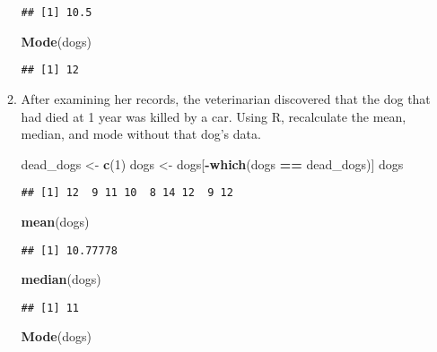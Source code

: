 \documentclass[]{article}
\newenvironment{Shaded}{\begin{snugshade}}{\end{snugshade}}
\newcommand{\KeywordTok}[1]{\textcolor[rgb]{0.13,0.29,0.53}{\textbf{#1}}}
\newcommand{\DecValTok}[1]{\textcolor[rgb]{0.00,0.00,0.81}{#1}}
\newcommand{\StringTok}[1]{\textcolor[rgb]{0.31,0.60,0.02}{#1}}
\newcommand{\OperatorTok}[1]{\textcolor[rgb]{0.81,0.36,0.00}{\textbf{#1}}}
\newcommand{\NormalTok}[1]{#1}
\begin{document}
\begin{enumerate}
\begin{enumerate}
\begin{verbatim}
## [1] 10.5
\end{verbatim}

\begin{Shaded}
\begin{Highlighting}[]
\KeywordTok{Mode}\NormalTok{(dogs)}
\end{Highlighting}
\end{Shaded}

\begin{verbatim}
## [1] 12
\end{verbatim}
  \item
    After examining her records, the veterinarian discovered that the
    dog that had died at 1 year was killed by a car. Using R,
    recalculate the mean, median, and mode without that dog's data.

\begin{Shaded}
\begin{Highlighting}[]
\NormalTok{dead_dogs <-}\StringTok{ }\KeywordTok{c}\NormalTok{(}\DecValTok{1}\NormalTok{)}
\NormalTok{dogs <-}\StringTok{ }\NormalTok{dogs[}\OperatorTok{-}\KeywordTok{which}\NormalTok{(dogs }\OperatorTok{==}\StringTok{ }\NormalTok{dead_dogs)]}
\NormalTok{dogs}
\end{Highlighting}
\end{Shaded}

\begin{verbatim}
## [1] 12  9 11 10  8 14 12  9 12
\end{verbatim}

\begin{Shaded}
\begin{Highlighting}[]
\KeywordTok{mean}\NormalTok{(dogs)}
\end{Highlighting}
\end{Shaded}

\begin{verbatim}
## [1] 10.77778
\end{verbatim}

\begin{Shaded}
\begin{Highlighting}[]
\KeywordTok{median}\NormalTok{(dogs)}
\end{Highlighting}
\end{Shaded}

\begin{verbatim}
## [1] 11
\end{verbatim}

\begin{Shaded}
\begin{Highlighting}[]
\KeywordTok{Mode}\NormalTok{(dogs)}
\end{Highlighting}
\end{Shaded}


\end{enumerate}
\end{enumerate}
\end{document}
